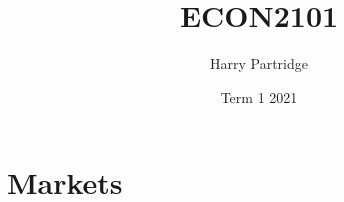 \documentclass[a4paper]{article}
\title{ECON2101}
\author{Harry Partridge}
\date{Term 1 2021}
\begin{document}
\maketitle

\tableofcontents
\section{Markets}
\end{document}

